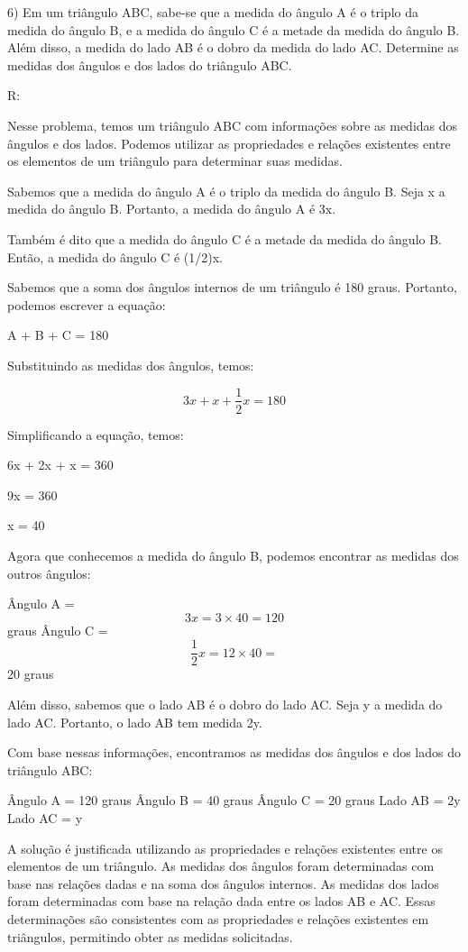 6) Em um triângulo ABC, sabe-se que a medida do ângulo A é o triplo da
medida do ângulo B, e a medida do ângulo C é a metade da medida do
ângulo B. Além disso, a medida do lado AB é o dobro da medida do lado
AC. Determine as medidas dos ângulos e dos lados do triângulo ABC.

R:

Nesse problema, temos um triângulo ABC com informações sobre as medidas
dos ângulos e dos lados. Podemos utilizar as propriedades e relações
existentes entre os elementos de um triângulo para determinar suas
medidas.

Sabemos que a medida do ângulo A é o triplo da medida do ângulo B. Seja
x a medida do ângulo B. Portanto, a medida do ângulo A é 3x.

Também é dito que a medida do ângulo C é a metade da medida do ângulo B.
Então, a medida do ângulo C é (1/2)x.

Sabemos que a soma dos ângulos internos de um triângulo é 180 graus.
Portanto, podemos escrever a equação:

A + B + C = 180

Substituindo as medidas dos ângulos, temos:

\[ 3x + x + \frac {1}{2}x = 180\]

Simplificando a equação, temos:

6x + 2x + x = 360

9x = 360

x = 40

Agora que conhecemos a medida do ângulo B, podemos encontrar as medidas
dos outros ângulos:

Ângulo A = \[3x = 3 \times 40 = 120\] graus Ângulo C =
\[\frac {1}{2}x = {1}{2} \times 40 =\] 20 graus

Além disso, sabemos que o lado AB é o dobro do lado AC. Seja y a medida
do lado AC. Portanto, o lado AB tem medida 2y.

Com base nessas informações, encontramos as medidas dos ângulos e dos
lados do triângulo ABC:

Ângulo A = 120 graus Ângulo B = 40 graus Ângulo C = 20 graus Lado AB =
2y Lado AC = y

A solução é justificada utilizando as propriedades e relações existentes
entre os elementos de um triângulo. As medidas dos ângulos foram
determinadas com base nas relações dadas e na soma dos ângulos internos.
As medidas dos lados foram determinadas com base na relação dada entre
os lados AB e AC. Essas determinações são consistentes com as
propriedades e relações existentes em triângulos, permitindo obter as
medidas solicitadas.

